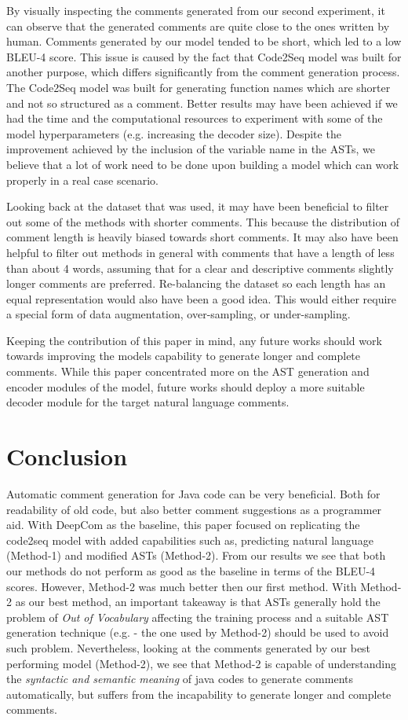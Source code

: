 \documentclass[a4paper,10pt]{article}
\theoremstyle{plain}
\theoremstyle{definition}
\begin{document}
\begin{multicols*}{2}
By visually inspecting the comments generated from our second experiment, it can observe that the generated comments are quite close to the ones written by human. Comments generated by our model tended to be short, which led to a low BLEU-4 score. This issue is caused by the fact that Code2Seq model was built for another purpose, which differs significantly from the comment generation process. The Code2Seq model was built for generating function names which are shorter and not so structured as a comment. Better results may have been achieved if we had the time and the computational resources to experiment with some of the model hyperparameters (e.g. increasing the decoder size). Despite the improvement achieved by the inclusion of the variable name in the ASTs, we believe that a lot of work need to be done upon building a model which can work properly in a real case scenario.

Looking back at the dataset that was used, it may have been beneficial to filter out some of the methods with shorter comments. This because the distribution of comment length is heavily biased towards short comments. It may also have been helpful to filter out methods in general with comments that have a length of less than about 4 words, assuming that for a clear and descriptive comments slightly longer comments are preferred. Re-balancing the dataset so each length has an equal representation would also have been a good idea. This would either require a special form of data augmentation, over-sampling, or under-sampling.

Keeping the contribution of this paper in mind, any future works should work towards improving the models capability to generate longer and complete comments. While this paper concentrated more on the AST generation and encoder modules of the model, future works should deploy a more suitable decoder module for the target natural language comments.


\section{Conclusion}
\label{conclusion}
Automatic comment generation for Java code can be very beneficial. Both for readability of old code, but also better comment suggestions as a programmer aid. With DeepCom as the baseline, this paper focused on replicating the code2seq model with added capabilities such as, predicting natural language (Method-1) and modified ASTs (Method-2). From our results we see that both our methods do not perform as good as the baseline in terms of the BLEU-4 scores. However, Method-2 was much better then our first method. With Method-2 as our best method, an important takeaway is that ASTs generally hold the problem of \textit{Out of Vocabulary} affecting the training process and a suitable AST generation technique (e.g. \cite{ZHOU2019328} - the one used by Method-2) should be used to avoid such problem. Nevertheless, looking at the comments generated by our best performing model (Method-2), we see that Method-2 is capable of understanding the \textit{syntactic and semantic meaning} of java codes to generate comments automatically, but suffers from the incapability to generate longer and complete comments.


\end{multicols*}
\end{document}
